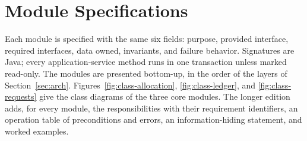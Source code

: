 \documentclass[10pt,letterpaper]{article}
\begin{document}

\newcommand{\sectionbreak}{\clearpage}   %
\setlength{\emergencystretch}{1.5em}





\renewcommand{\modulespec}[3]{\needspace{8\baselineskip}\subsection{#1 \normalfont\normalsize(\code{#2})}\label{mod:#3}}
\section{Module Specifications}\label{sec:modules}
Each module is specified with the same six fields: purpose, provided interface, required interfaces, data owned, invariants, and failure behavior. Signatures are Java; every application-service method runs in one transaction unless marked read-only. The modules are presented bottom-up, in the order of the layers of Section~\ref{sec:arch}. Figures~\ref{fig:class-allocation}, \ref{fig:class-ledger}, and \ref{fig:class-requests} give the class diagrams of the three core modules. The longer edition adds, for every module, the responsibilities with their requirement identifiers, an operation table of preconditions and errors, an information-hiding statement, and worked examples.









\renewcommand{\sectionbreak}{\bigskip}   %

\appendix



\end{document}
